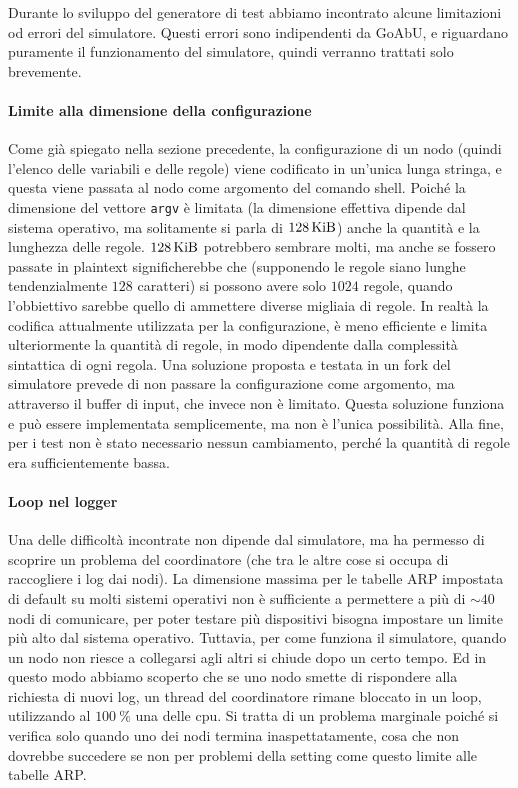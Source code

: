 \documentclass[12pt, a4paper]{article}
\begin{document}
Durante lo sviluppo del generatore di test abbiamo incontrato alcune limitazioni od errori del simulatore. Questi errori sono indipendenti da GoAbU, e riguardano puramente il funzionamento del simulatore, quindi verranno trattati solo brevemente.

\paragraph{Limite alla dimensione della configurazione}

Come già spiegato nella sezione precedente, la configurazione di un nodo (quindi l'elenco delle variabili e delle regole) viene codificato in un'unica lunga stringa, e questa viene passata al nodo come argomento del comando shell. Poiché la dimensione del vettore \lstinline{argv} è limitata (la dimensione effettiva dipende dal sistema operativo, ma solitamente si parla di \ensuremath{\qty{128}{\kibi\byte}}) anche la quantità e la lunghezza delle regole.
\ensuremath{\qty{128}{\kibi\byte}} potrebbero sembrare molti, ma anche se fossero passate in plaintext significherebbe che (supponendo le regole siano lunghe tendenzialmente $128$ caratteri) si possono avere solo $1024$ regole, quando l'obbiettivo sarebbe quello di ammettere diverse migliaia di regole. In realtà la codifica attualmente utilizzata per la configurazione, è meno efficiente e limita ulteriormente la quantità di regole, in modo dipendente dalla complessità sintattica di ogni regola.
Una soluzione proposta e testata in un fork del simulatore prevede di non passare la configurazione come argomento, ma attraverso il buffer di input, che invece non è limitato. Questa soluzione funziona e può essere implementata semplicemente, ma non è l'unica possibilità.
Alla fine, per i test non è stato necessario nessun cambiamento, perché la quantità di regole era sufficientemente bassa.

\paragraph{Loop nel logger}

Una delle difficoltà incontrate non dipende dal simulatore, ma ha permesso di scoprire un problema del coordinatore (che tra le altre cose si occupa di raccogliere i log dai nodi).
La dimensione massima per le tabelle ARP impostata di default su molti sistemi operativi non è sufficiente a permettere a più di $\sim40$ nodi di comunicare, per poter testare più dispositivi bisogna impostare un limite più alto dal sistema operativo. Tuttavia, per come funziona il simulatore, quando un nodo non riesce a collegarsi agli altri si chiude dopo un certo tempo.
Ed in questo modo abbiamo scoperto che se uno nodo smette di rispondere alla richiesta di nuovi log, un thread del coordinatore rimane bloccato in un loop, utilizzando al $\qty{100}{\percent}$ una delle cpu.
Si tratta di un problema marginale poiché si verifica solo quando uno dei nodi termina inaspettatamente, cosa che non dovrebbe succedere se non per problemi della setting come questo limite alle tabelle ARP.
\end{document}
